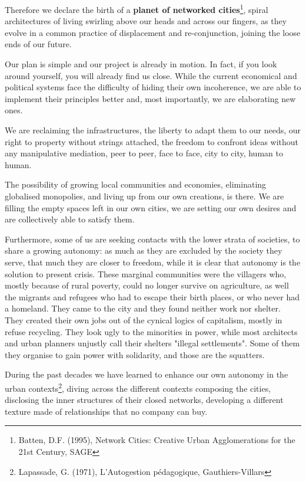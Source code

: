 Therefore we declare the birth of a \textbf{planet of networked
cities}\footnote{Batten, D.F. (1995), Network Cities: Creative Urban
Agglomerations for the 21st Century, SAGE}, spiral architectures of living
swirling above our heads and across our f\hbox{}ingers, as they evolve in a
common practice of displacement and re-conjunction, joining the loose ends of
our future.

Our plan is simple and our project is already in motion. In fact, if you look
around yourself, you will already f\hbox{}ind us close. While the current
economical and political systems face the dif\hbox{}f\hbox{}iculty of hiding
their own incoherence, we are able to implement their principles better and,
most importantly, we are elaborating new ones.

We are reclaiming the infrastructures, the liberty to adapt them to our needs,
our right to property without strings attached, the freedom to confront ideas
without any manipulative mediation, peer to peer, face to face, city to city,
human to human.

The possibility of growing local communities and economies, eliminating
globalised monopolies, and living up from our own creations, is there. We are
f\hbox{}illing the empty spaces left in our own cities, we are setting our own
desires and are collectively able to satisfy them.

Furthermore, some of us are seeking contacts with the lower strata of societies,
to share a growing autonomy: as much as they are excluded by the society they
serve, that much they are closer to freedom, while it is clear that autonomy is
the solution to present crisis. These marginal communities were the villagers
who, mostly because of rural poverty, could no longer survive on agriculture, as
well the migrants and refugees who had to escape their birth places, or who
never had a homeland. They came to the city and they found neither work nor
shelter. They created their own jobs out of the cynical logics of capitalism,
mostly in refuse recycling. They look ugly to the minorities in power, while
most architects and urban planners unjustly call their shelters "illegal
settlements". Some of them they organise to gain power with solidarity, and
those are the squatters.

During the past decades we have learned to enhance our own autonomy in the urban
contexts\footnote{Lapassade, G. (1971), L'Autogestion pédagogique,
Gauthiers-Villars}, diving across the dif\hbox{}ferent contexts composing the
cities, disclosing the inner structures of their closed networks, developing a
dif\hbox{}ferent texture made of relationships that no company can buy.

